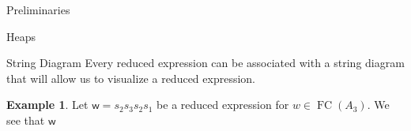\documentclass[11pt]{amsart}
\theoremstyle{definition}
\newtheorem{example}[theorem]{Example}
\numberwithin{equation}{section}
\newcommand{\C}{\widetilde{C}}
\renewcommand{\(}{\left(}
\renewcommand{\)}{\right)}
\newcommand{\w}{\mathsf{w}}
\DeclareMathOperator{\FC}{FC}
\newcommand\xxaxis{0}
\newcommand\yyaxis{90}
\newcommand\heapblock[3]{\fill[draw=black, fill=gray!30, rounded corners, line width=1.1pt, shift={(\xxaxis:#1)},shift={(\yyaxis:#2)}] (-1,-0.5) rectangle (1,0.5);\node at (#1,#2) {$#3$};}
\newcommand\heapblank[2]{\fill[fill=white, dotted, draw=black, line width=1.1pt, rounded corners, shift={(\xxaxis:#1)},shift={(\yyaxis:#2)}] (-1,-0.5) rectangle (1,0.5);}
\begin{document}
\begin{section}{Preliminaries}
\begin{subsection}{Heaps}

\end{subsection}

\begin{subsection}{String Diagram}
Every reduced expression can be associated with a string diagram that will allow us to visualize a reduced expression. 

\begin{example}
Let $\w=s_2s_3s_2s_1$ be a reduced expression for $w \in \FC(A_3)$. We see that $\w$ 
\end{example}


\end{subsection}
\end{section}
\end{document}
